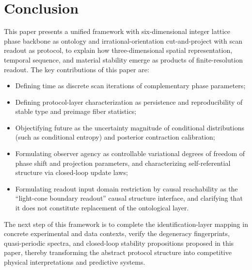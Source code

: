 \section{Conclusion}

This paper presents a unified framework with six-dimensional integer lattice phase backbone as ontology and irrational-orientation cut-and-project with scan readout as protocol, to explain how three-dimensional spatial representation, temporal sequence, and material stability emerge as products of finite-resolution readout. The key contributions of this paper are:
\begin{itemize}
  \item Defining time as discrete scan iterations of complementary phase parameters;
  \item Defining protocol-layer characterization as persistence and reproducibility of stable type and preimage fiber statistics;
  \item Objectifying future as the uncertainty magnitude of conditional distributions (such as conditional entropy) and posterior contraction calibration;
  \item Formulating observer agency as controllable variational degrees of freedom of phase shift and projection parameters, and characterizing self-referential structure via closed-loop update laws;
  \item Formulating readout input domain restriction by causal reachability as the ``light-cone boundary readout'' causal structure interface, and clarifying that it does not constitute replacement of the ontological layer.
\end{itemize}

The next step of this framework is to complete the identification-layer mapping in concrete experimental and data contexts, verify the degeneracy fingerprints, quasi-periodic spectra, and closed-loop stability propositions proposed in this paper, thereby transforming the abstract protocol structure into competitive physical interpretations and predictive systems.

